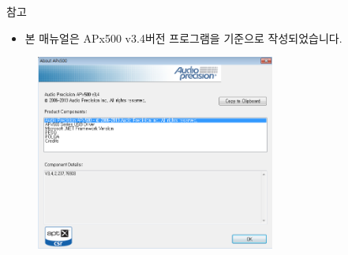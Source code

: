 \documentclass{beamer}
\begin{document}
	
	\begin{frame}[t]{참고}
		\begin{itemize}
			\item 본 매뉴얼은 APx500 v3.4버전 프로그램을 기준으로 작성되었습니다.
		\end{itemize}
		
		\begin{figure}
			\begin{center}
				\includegraphics[width=0.7\textwidth]{figure/apsetting/apx_version.png}
			\end{center}
		\end{figure}
	\end{frame}
	
	
	
\end{document}
